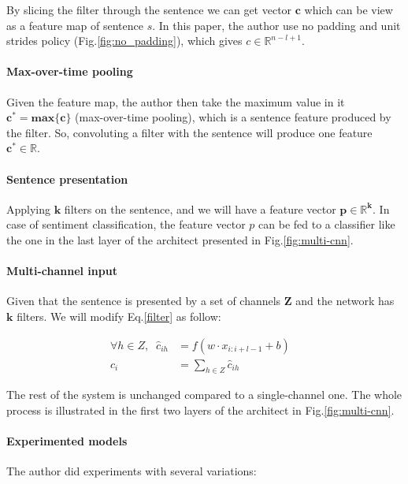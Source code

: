By slicing the filter through the sentence we can get vector \(\bm{c}\) which can be view as a feature map of sentence \(s\). 
In this paper, the author use no padding and unit strides policy (Fig.\ref{fig:no_padding}), which gives \(c \in \mathbb{R}^{n-l+1}\).

\paragraph{Max-over-time pooling}\label{sec:max-overtime-pooling} Given the feature map, the author then take the maximum value in it \(\bm{c^* = max\{c\}}\) (max-over-time pooling\cite{nlp-scratch}), which is a sentence feature produced by the filter.
So, convoluting a filter with the sentence will produce one feature \(\bm{c^* \in \mathbb{R}}\).

\paragraph{Sentence presentation} Applying \(\bm{k}\) filters on the sentence, and we will have a feature vector \(\bm{p \in \mathbb{R}^k}\). 
In case of sentiment classification, the feature vector \(p\) can be fed to a classifier like the one in the last layer of the architect presented in Fig.\ref{fig:multi-cnn}.

\paragraph{Multi-channel input} Given that the sentence is presented by a set of channels \(\bm{Z}\) and the network has \(\bm{k}\) filters. 
We will modify Eq.\eqref{filter} as follow: 

\begin{align}
	\forall h \in Z, \; \; \hat{c}_{ih} &= f(w \cdot x_{i:i+l-1} + b)& \\
	c_i &= \sum_{h \in Z} \hat{c}_{ih}&
\end{align}

The rest of the system is unchanged compared to a single-channel one.
The whole process is illustrated in the first two layers of the architect in Fig.\ref{fig:multi-cnn}.

\paragraph{Experimented models} The author did experiments with several variations:

